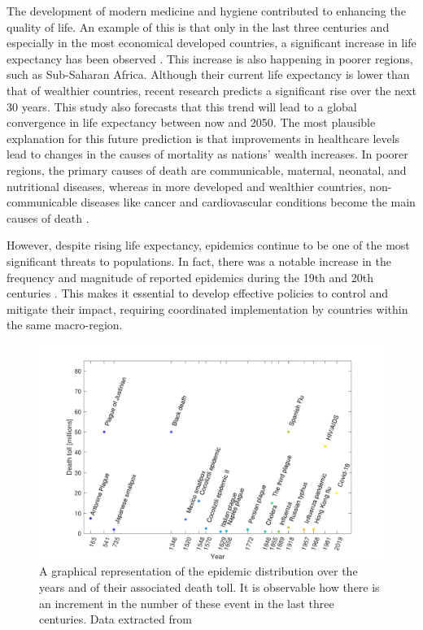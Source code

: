 The development of modern medicine and hygiene contributed to enhancing the quality of life. An example of this is that only in the last three centuries and especially in the most economical developed countries, a significant increase in life expectancy has been observed \cite{Anderson_82}.
This increase is also happening in poorer regions, such as Sub-Saharan Africa. Although their current life expectancy is lower than that of wealthier countries, recent research \cite{Vollset_2024} predicts a significant rise over the next 30 years. This study also forecasts that this trend will lead to a global convergence in life expectancy between now and 2050.
The most plausible explanation for this future prediction is that improvements in healthcare levels lead to changes in the causes of mortality as nations' wealth increases. In poorer regions, the primary causes of death are communicable, maternal, neonatal, and nutritional diseases, whereas in more developed and wealthier countries, non-communicable diseases like cancer and cardiovascular conditions become the main causes of death \cite{eurostat}.

However, despite rising life expectancy, epidemics continue to be one of the most significant threats to populations. In fact, there was a notable increase in the frequency and magnitude of reported epidemics during the 19th and 20th centuries \cite{Anderson_82}. This makes it essential to develop effective policies to control and mitigate their impact, requiring coordinated implementation by countries within the same macro-region.
\begin{figure}[h]
	\centering
	\includegraphics[width=0.85\linewidth]{0_introduction/images_introduction/worst_epidemic}
	\caption[Epidemic distribution in time]{A graphical representation of the epidemic distribution over the years and of their associated death toll. It is observable how there is an increment in the number of these event in the last three centuries. Data extracted from \cite{owid_historical_pandemics,wiki_pandemics}}
	\label{fig:worstepidemic}
\end{figure}

